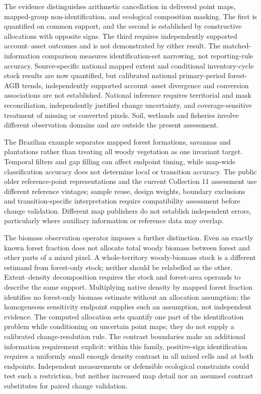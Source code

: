 \documentclass[11pt,a4paper]{article}
\begin{document}
The evidence distinguishes arithmetic cancellation in delivered point maps, mapped-group non-identification, and ecological composition masking. The first is quantified on common support, and the second is established by constructive allocations with opposite signs. The third requires independently supported account--asset outcomes and is not demonstrated by either result. The matched-information comparison measures identification-set narrowing, not reporting-rule accuracy. Source-specific national mapped extent and conditional inventory-cycle stock results are now quantified, but calibrated national primary-period forest-AGB trends, independently supported account--asset divergence and conversion associations are not established. National inference requires territorial and mask reconciliation, independently justified change uncertainty, and coverage-sensitive treatment of missing or converted pixels. Soil, wetlands and fisheries involve different observation domains and are outside the present assessment.

The Brazilian example separates mapped forest formations, savannas and plantations rather than treating all woody vegetation as one invariant target. Temporal filters and gap filling can affect endpoint timing, while map-wide classification accuracy does not determine local or transition accuracy. The public older reference-point representations and the current Collection 11 assessment use different reference vintages; sample reuse, design weights, boundary exclusions and transition-specific interpretation require compatibility assessment before change validation. Different map publishers do not establish independent errors, particularly where auxiliary information or reference data may overlap.

The biomass observation operator imposes a further distinction. Even an exactly known forest fraction does not allocate total woody biomass between forest and other parts of a mixed pixel. A whole-territory woody-biomass stock is a different estimand from forest-only stock; neither should be relabelled as the other. Extent--density decomposition requires the stock and forest-area operands to describe the same support. Multiplying native density by mapped forest fraction identifies no forest-only biomass estimate without an allocation assumption; the homogeneous sensitivity endpoint supplies such an assumption, not independent evidence. The computed allocation sets quantify one part of the identification problem while conditioning on uncertain point maps; they do not supply a calibrated change-resolution rule. The contrast boundaries make an additional information requirement explicit: within this family, positive-sign identification requires a uniformly small enough density contrast in all mixed cells and at both endpoints. Independent measurements or defensible ecological constraints could test such a restriction, but neither increased map detail nor an assumed contrast substitutes for paired change validation.
\end{document}
